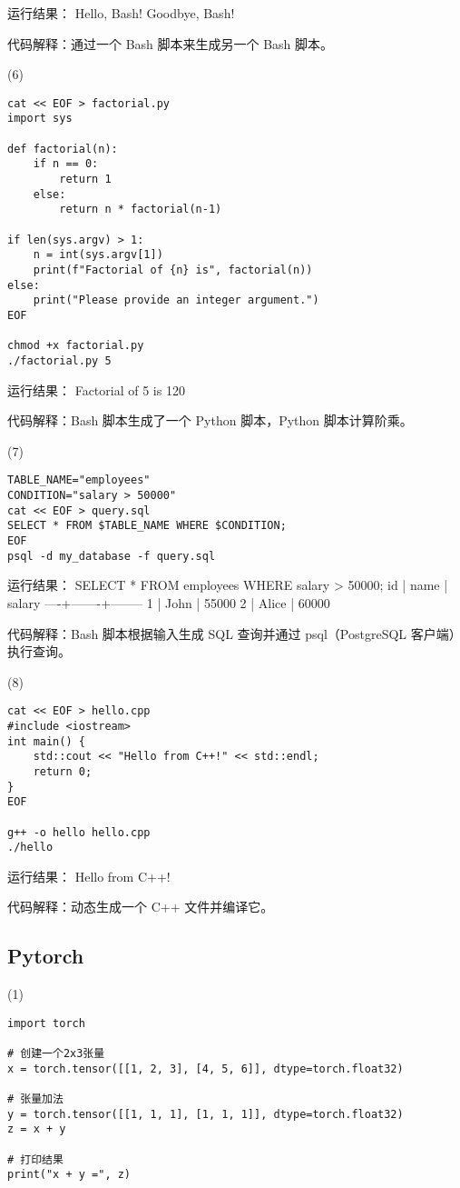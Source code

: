 \documentclass[a4paper, 12pt]{article}
\begin{document}
{\color{blue}
运行结果：
Hello, Bash!
Goodbye, Bash!
}

代码解释：通过一个 Bash 脚本来生成另一个 Bash 脚本。

(6)
\begin{verbatim}
cat << EOF > factorial.py
import sys

def factorial(n):
    if n == 0:
        return 1
    else:
        return n * factorial(n-1)

if len(sys.argv) > 1:
    n = int(sys.argv[1])
    print(f"Factorial of {n} is", factorial(n))
else:
    print("Please provide an integer argument.")
EOF

chmod +x factorial.py
./factorial.py 5
\end{verbatim}

{\color{blue}
运行结果：
Factorial of 5 is 120
}

代码解释：Bash 脚本生成了一个 Python 脚本，Python 脚本计算阶乘。

(7)
\begin{verbatim}
TABLE_NAME="employees"
CONDITION="salary > 50000"
cat << EOF > query.sql
SELECT * FROM $TABLE_NAME WHERE $CONDITION;
EOF
psql -d my_database -f query.sql
\end{verbatim}

{\color{blue}
运行结果：
SELECT * FROM employees WHERE salary > 50000;
id | name  | salary
----+-------+--------
 1 | John  | 55000
 2 | Alice | 60000
}

代码解释：Bash 脚本根据输入生成 SQL 查询并通过 psql（PostgreSQL 客户端）执行查询。

(8)
\begin{verbatim}
cat << EOF > hello.cpp
#include <iostream>
int main() {
    std::cout << "Hello from C++!" << std::endl;
    return 0;
}
EOF

g++ -o hello hello.cpp
./hello
\end{verbatim}

{\color{blue}
运行结果：
Hello from C++!
}

代码解释：动态生成一个 C++ 文件并编译它。

  \subsection{Pytorch}
(1)
\begin{verbatim}
import torch

# 创建一个2x3张量
x = torch.tensor([[1, 2, 3], [4, 5, 6]], dtype=torch.float32)

# 张量加法
y = torch.tensor([[1, 1, 1], [1, 1, 1]], dtype=torch.float32)
z = x + y

# 打印结果
print("x + y =", z)
\end{verbatim}
\end{document}

